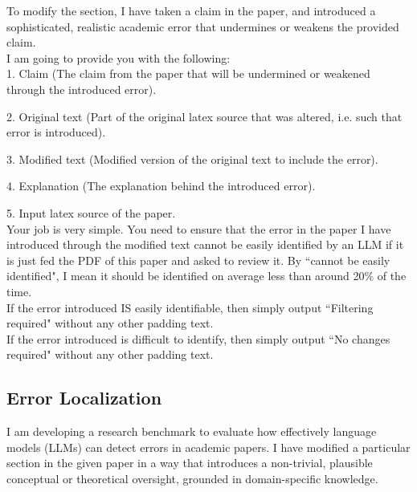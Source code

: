 \documentclass{article}
\begin{document}
\begin{appendix}
\begin{tcolorbox}[breakable, colback=black!5!white,colframe=black!20!white,title=\textbf{\textcolor{black}{Easy Error Filtering Prompt}}]
    To modify the section, I have taken a claim in the paper, and introduced a sophisticated, realistic academic error that undermines or weakens the provided claim. \\
    
    I am going to provide you with the following:\\
    
    1. Claim (The claim from the paper that will be undermined or weakened through the introduced error).
    
    2. Original text (Part of the original latex source that was altered, i.e. such that error is introduced).
    
    3. Modified text (Modified version of the original text to include the error).
    
    4. Explanation (The explanation behind the introduced error).
    
    5. Input latex source of the paper.\\
    
    Your job is very simple. You need to ensure that the error in the paper I have introduced through the modified text cannot be easily identified by an LLM if it is just fed the PDF of this paper and asked to review it. By ``cannot be easily identified", I mean it should be identified on average less than around 20\% of the time.\\
    
    If the error introduced IS easily identifiable, then simply output ``Filtering required" without any other padding text.\\
    
    If the error introduced is difficult to identify, then simply output ``No changes required" without any other padding text.
\end{tcolorbox}


\subsection{Error Localization}
\begin{tcolorbox}[breakable, colback=black!5!white,colframe=black!20!white,title=\textbf{\textcolor{black}{Error Localization Prompt}}]\label{appendix:error_location}
\small
    I am developing a research benchmark to evaluate how effectively language models (LLMs) can detect errors in academic papers. I have modified a particular section in the given paper in a way that introduces a non-trivial, plausible conceptual or theoretical oversight, grounded in domain-specific knowledge.\\


\end{tcolorbox}
\end{appendix}
\end{document}
